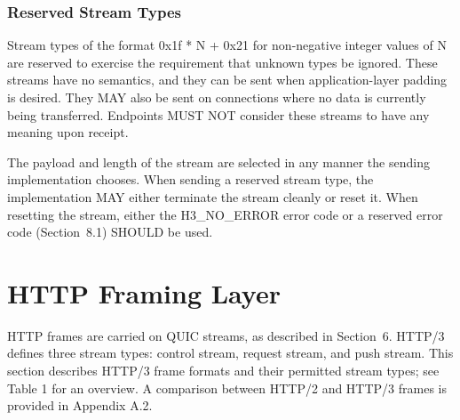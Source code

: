 \documentclass{article}
\begin{document}
\subsubsection{Reserved Stream Types}

Stream types of the format 0x1f * N + 0x21 for non-negative integer values of N are reserved to exercise the requirement that unknown types be ignored.  These streams have no semantics, and they can be sent when application-layer padding is desired.  They MAY also be sent on connections where no data is currently being transferred. Endpoints MUST NOT consider these streams to have any meaning upon receipt.

The payload and length of the stream are selected in any manner the sending implementation chooses.  When sending a reserved stream type, the implementation MAY either terminate the stream cleanly or reset it.  When resetting the stream, either the H3\_NO\_ERROR error code or a reserved error code (Section~8.1) SHOULD be used.

\section{HTTP Framing Layer}

HTTP frames are carried on QUIC streams, as described in Section~6. HTTP/3 defines three stream types: control stream, request stream, and push stream.  This section describes HTTP/3 frame formats and their permitted stream types; see Table 1 for an overview.  A comparison between HTTP/2 and HTTP/3 frames is provided in Appendix A.2.
\end{document}
